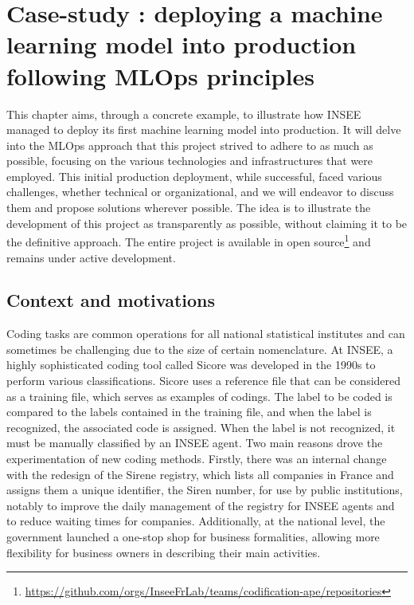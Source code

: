 \section{Case-study : deploying a machine learning model into production following MLOps principles}
\label{sec:mlops}

This chapter aims, through a concrete example, to illustrate how INSEE managed to deploy its first machine learning model into production. It will delve into the MLOps approach that this project strived to adhere to as much as possible, focusing on the various technologies and infrastructures that were employed. This initial production deployment, while successful, faced various challenges, whether technical or organizational, and we will endeavor to discuss them and propose solutions wherever possible. The idea is to illustrate the development of this project as transparently as possible, without claiming it to be the definitive approach. The entire project is available in open source\footnote{\url{https://github.com/orgs/InseeFrLab/teams/codification-ape/repositories}} and remains under active development.

\subsection{Context and motivations}

Coding tasks are common operations for all national statistical institutes and can sometimes be challenging due to the size of certain nomenclature. At INSEE, a highly sophisticated coding tool called Sicore was developed in the 1990s to perform various classifications. Sicore uses a reference file that can be considered as a training file, which serves as examples of codings. The label to be coded is compared to the labels contained in the training file, and when the label is recognized, the associated code is assigned. When the label is not recognized, it must be manually classified by an INSEE agent. Two main reasons drove the experimentation of new coding methods. Firstly, there was an internal change with the redesign of the Sirene registry, which lists all companies in France and assigns them a unique identifier, the Siren number, for use by public institutions, notably to improve the daily management of the registry for INSEE agents and to reduce waiting times for companies. Additionally, at the national level, the government launched a one-stop shop for business formalities, allowing more flexibility for business owners in describing their main activities.

